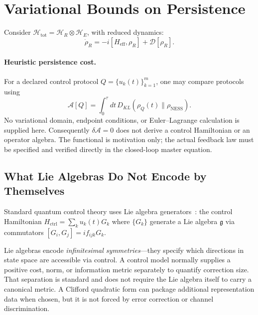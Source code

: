 \documentclass[aps,pre,onecolumn,superscriptaddress,floatfix,longbibliography]{revtex4-2}
\begin{document}
\section{Variational Bounds on Persistence}
\label{sec:variational}

Consider $\mathcal{H}_{\mathrm{tot}} = \mathcal{H}_R \otimes \mathcal{H}_E$, with reduced dynamics:
\begin{equation}
\dot{\rho}_R = -i[H_{\mathrm{eff}}, \rho_R] + \mathcal{D}[\rho_R].
\end{equation}

\paragraph{Heuristic persistence cost.}
For a declared control protocol $Q=\{u_k(t)\}_{k=1}^m$, one may compare protocols using
\begin{equation}
\mathcal{A}[Q] = \int_0^\tau dt\, D_{KL}(\rho_Q(t) \| \rho_{\mathrm{NESS}}).
\end{equation}
No variational domain, endpoint conditions, or Euler--Lagrange calculation is supplied here.  Consequently $\delta\mathcal A=0$ does not derive a control Hamiltonian or an operator algebra.  The functional is motivation only; the actual feedback law must be specified and verified directly in the closed-loop master equation.

\subsection{What Lie Algebras Do Not Encode by Themselves}

Standard quantum control theory uses Lie algebra generators~\cite{WisemanMilburn2009}: the control Hamiltonian $H_{\mathrm{ctrl}} = \sum_k u_k(t) G_k$ where $\{G_k\}$ generate a Lie algebra $\mathfrak{g}$ via commutators $[G_i, G_j] = i f_{ijk} G_k$.

Lie algebras encode \emph{infinitesimal symmetries}---they specify which directions in state space are accessible via control.  A control model normally supplies a positive cost, norm, or information metric separately to quantify correction size.  That separation is standard and does not require the Lie algebra itself to carry a canonical metric.  A Clifford quadratic form can package additional representation data when chosen, but it is not forced by error correction or channel discrimination.

\end{document}
